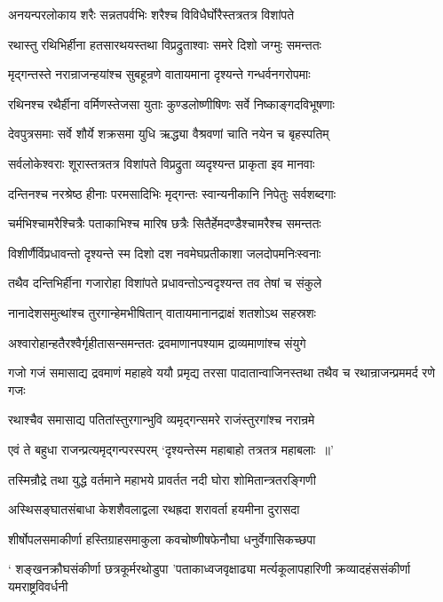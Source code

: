 \twolineshloka
{अनयन्परलोकाय शरैः सन्नतपर्वभिः}
{शरैश्च विविधैर्घोरैस्तत्रतत्र विशांपते}


\twolineshloka
{रथास्तु रथिभिर्हीना हतसारथयस्तथा}
{विप्रद्रुताश्वाः समरे दिशो जग्मुः समन्ततः}


\twolineshloka
{मृद्गन्तस्ते नरान्राजन्हयांश्च सुबहून्रणे}
{वातायमाना दृश्यन्ते गन्धर्वनगरोपमाः}


\twolineshloka
{रथिनश्च रथैर्हीना वर्मिणस्तेजसा युताः}
{कुण्डलोष्णीषिणः सर्वे निष्काङ्गदविभूषणाः}


\twolineshloka
{देवपुत्रसमाः सर्वे शौर्ये शक्रसमा युधि}
{ऋद्ध्या वैश्रवणां चाति नयेन च बृहस्पतिम्}


\twolineshloka
{सर्वलोकेश्वराः शूरास्तत्रतत्र विशांपते}
{विप्रद्रुता व्यदृश्यन्त प्राकृता इव मानवाः}


\twolineshloka
{दन्तिनश्च नरश्रेष्ठ हीनाः परमसादिभिः}
{मृद्गन्तः स्वान्यनीकानि निपेतुः सर्वशब्दगाः}


\twolineshloka
{चर्मभिश्चामरैश्चित्रैः पताकाभिश्च मारिष}
{छत्रैः सितैर्हेमदण्डैश्चामरैश्च समन्ततः}


\twolineshloka
{विशीर्णैर्विप्रधावन्तो दृश्यन्ते स्म दिशो दश}
{नवमेघप्रतीकाशा जलदोपमनिःस्वनाः}


\twolineshloka
{तथैव दन्तिभिर्हीना गजारोहा विशांपते}
{प्रधावन्तोऽन्वदृश्यन्त तव तेषां च संकुले}


\twolineshloka
{नानादेशसमुत्थांश्च तुरगान्हेमभीषितान्}
{वातायमानानद्राक्षं शतशोऽथ सहस्रशः}


\twolineshloka
{अश्वारोहान्हतैरश्वैर्गृहीतासन्समन्ततः}
{द्रवमाणानपश्याम द्राव्यमाणांश्च संयुगे}


\threelineshloka
{गजो गजं समासाद्य द्रवमाणं महाहवे}
{ययौ प्रमृद्य तरसा पादातान्वाजिनस्तथा}
{तथैव च रथान्राजन्प्रममर्द रणे गजः}


\twolineshloka
{रथाश्चैव समासाद्य पतितांस्तुरगान्भुवि}
{व्यमृद्गन्समरे राजंस्तुरगांश्च नरान्रमे}


\twolineshloka
{एवं ते बहुधा राजन्प्रत्यमृद्गन्परस्परम्}
{`दृश्यन्तेस्म महाबाहो तत्रतत्र महाबलाः ॥'}


\twolineshloka
{तस्मिन्रौद्रे तथा युद्धे वर्तमाने महाभये}
{प्रावर्तत नदी घोरा शोमितान्त्रतरङ्गिणी}


\twolineshloka
{अस्थिसङ्घातसंबाधा केशशैवलाद्वला}
{रथह्रदा शरावर्ता हयमीना दुरासदा}


\twolineshloka
{शीर्षोपलसमाकीर्णा हस्तिग्राहसमाकुला}
{कवचोष्णीषफेनौघा धनुर्वेगासिकच्छपा}


\threelineshloka
{` शङ्खनक्रौघसंकीर्णा छत्रकूर्मरथोडुपा}
{'पताकाध्वजवृक्षाढ्या मर्त्यकूलापहारिणी}
{क्रव्यादहंससंकीर्णा यमराष्ट्रविवर्धनी}


